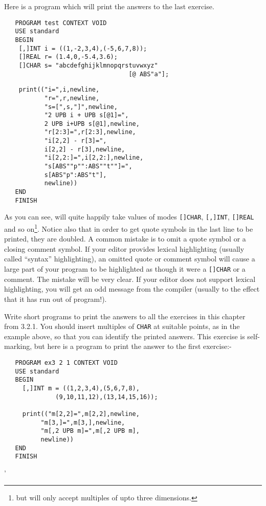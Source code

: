 Here is a program which will print the answers to the last exercise.
\begin{verbatim}
   PROGRAM test CONTEXT VOID
   USE standard
   BEGIN
    [,]INT i = ((1,-2,3,4),(-5,6,7,8));
    []REAL r= (1.4,0,-5.4,3.6);
    []CHAR s= "abcdefghijklmnopqrstuvwxyz"
                                  [@ ABS"a"];
\end{verbatim}
\begin{verbatim}
    print(("i=",i,newline,
           "r=",r,newline,
           "s=[",s,"]",newline,
           "2 UPB i + UPB s[@1]=",
           2 UPB i+UPB s[@1],newline,
           "r[2:3]=",r[2:3],newline,
           "i[2,2] - r[3]=",
           i[2,2] - r[3],newline,
           "i[2,2:]=",i[2,2:],newline,
           "s[ABS""p"":ABS""t""]=",
           s[ABS"p":ABS"t"],
           newline))
   END
   FINISH
\end{verbatim}
\noindent
As you can see,  will quite happily take values of modes
\verb|[]CHAR|, \verb|[,]INT|, \verb|[]REAL| and so on\footnote{but
\protect{} will only accept multiples of
upto three dimensions.}.  Notice also that in order to get quote
symbols in the last line to be printed, they are doubled.  A common
mistake is to omit a quote symbol or a closing comment symbol. If
your editor provides lexical highlighting (usually called ``syntax''
highlighting), an omitted quote or comment symbol will cause a large
part of your program to be highlighted as though it were a
\verb|[]CHAR| or a comment. The mistake will be very clear. If your
editor does not support lexical highlighting, you will get an odd
message from the compiler (usually to the effect that it has run out
of program!).

\begin{exercise}
\item Write short programs to print the answers to all the exercises
in this chapter from 3.2.1. You should insert multiples of
\verb|CHAR| at suitable points, as in the example above, so that you
can identify the printed answers. \ans This exercise is self-marking,
but here is a program to print the answer to the first exercise:-
\begin{verbatim}
   PROGRAM ex3 2 1 CONTEXT VOID
   USE standard
   BEGIN
     [,]INT m = ((1,2,3,4),(5,6,7,8),
              (9,10,11,12),(13,14,15,16));

     print(("m[2,2]=",m[2,2],newline,
          "m[3,]=",m[3,],newline,
          "m[,2 UPB m]=",m[,2 UPB m],
          newline))
   END
   FINISH
\end{verbatim}
'
\end{exercise}

